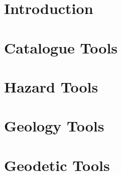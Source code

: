 \documentclass[11pt,fleqn]{book} %
\begin{document}
\chapter{Introduction}
\label{chap:intro}


\chapter{Catalogue Tools}
\label{chap:catalogue}


\chapter{Hazard Tools}
\label{chap:hazard}


\chapter{Geology Tools}
\label{chap:geology}


\chapter{Geodetic Tools}
\label{chap:geodesy}

\end{document}
